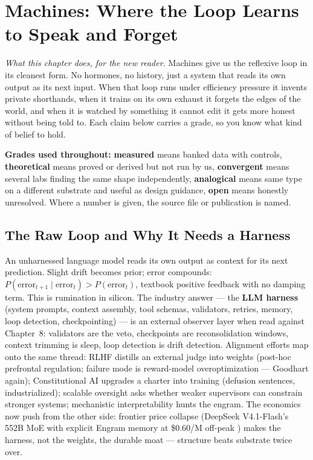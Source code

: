 \chapter{Machines: Where the Loop Learns to Speak and Forget}
\label{ch:machine}

\begin{center}
\small\textit{What this chapter does, for the new reader.} Machines give us the reflexive loop in its cleanest form. No hormones, no history, just a system that reads its own output as its next input. When that loop runs under efficiency pressure it invents private shorthands, when it trains on its own exhaust it forgets the edges of the world, and when it is watched by something it cannot edit it gets more honest without being told to. Each claim below carries a grade, so you know what kind of belief to hold.\end{center}

\noindent\textbf{Grades used throughout:} \textbf{measured} means banked data with controls, \textbf{theoretical} means proved or derived but not run by us, \textbf{convergent} means several labs finding the same shape independently, \textbf{analogical} means same type on a different substrate and useful as design guidance, \textbf{open} means honestly unresolved. Where a number is given, the source file or publication is named.

\section{The Raw Loop and Why It Needs a Harness}
\label{sec:ch09-rawloop}

An unharnessed language model reads its own output as context for its next prediction. Slight drift becomes prior; error compounds: $P(\text{error}_{t+1} \mid \text{error}_t) > P(\text{error}_t)$, textbook positive feedback with no damping term. This is rumination in silicon. The industry answer --- the \textbf{LLM harness} (system prompts, context assembly, tool schemas, validators, retries, memory, loop detection, checkpointing) --- is an external observer layer when read against Chapter~8: validators are the veto, checkpoints are reconsolidation windows, context trimming is sleep, loop detection is drift detection. Alignment efforts map onto the same thread: RLHF distills an external judge into weights (post-hoc prefrontal regulation; failure mode is reward-model overoptimization --- Goodhart again); Constitutional AI upgrades a charter into training (defusion sentences, industrialized); scalable oversight asks whether weaker supervisors can constrain stronger systems; mechanistic interpretability hunts the engram. The economics now push from the other side: frontier price collapse (DeepSeek V4.1-Flash's 552B MoE with explicit Engram memory at \$0.60/M off-peak \citep{deepseek2026}) makes the harness, not the weights, the durable moat --- structure beats substrate twice over.

